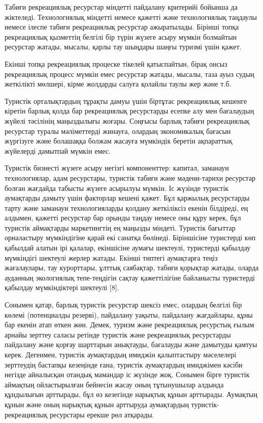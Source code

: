 Табиғи рекреациялық ресурстар міндетті пайдалану критерийі бойынша да
жіктеледі. Технологиялық міндетті немесе қажетті және технологиялық
таңдаулы немесе ілеспе табиғи рекреациялық ресурстар ажыратылады.
Бірінші топқа рекреациялық қызметтің белгілі бір түрін жүзеге асыру
мүмкін болмайтын ресурстар жатады, мысалы, қарлы тау шыңдары шаңғы
туризмі үшін қажет.

Екінші топқа рекреациялық процеске тікелей қатыспайтын, бірақ онсыз
рекреациялық процесс мүмкін емес ресурстар жатады, мысалы, таза ауыз
судың жеткілікті мөлшері, кірме жолдарды салуға қолайлы таулы жер және
т.б.

Туристік орталықтардың тұрақты дамуы үшін біртұтас рекреациялық кешенге
кіретін барлық қолда бар рекреациялық ресурстарды есепке алу мен
бағалаудың жүйелі тәсілінің маңыздылығы жоғары. Соңғысы барлық табиғи
рекреациялық ресурстар туралы мәліметтерді жинауға, олардың экономикалық
бағасын жүргізуге және болашаққа болжам жасауға мүмкіндік беретін
ақпараттық жүйелерді дамытпай мүмкін емес.

Туристік бизнесті жүзеге асыру негізгі компоненттер: капитал, заманауи
технологиялар, адам ресурстары, туристік табиғи және мәдени-тарихи
ресурстар болған жағдайда табысты жүзеге асырылуы мүмкін. Іс жүзінде
туристік аумақтарды дамыту үшін факторлар кешені қажет. Бұл қаржылық
ресурстарды тарту және заманауи технологияларды қолдану жеткіліксіз
екенін білдіреді, ең алдымен, қажетті ресурстар бар орынды таңдау немесе
оны құру керек, бұл туристік аймақтарды маркетингтің ең маңызды міндеті.
Туристік бағыттар орналастыру мүмкіндігіне қарай екі санатқа бөлінеді.
Біріншісіне туристерді көп қабылдай алатын ірі қалалар, екіншісіне
аумағы шектеулі, туристерді қабылдау мүмкіндігі шектеулі жерлер жатады.
Екінші типтегі аумақтарға теңіз жағалаулары, тау курорттары, ұлттық
саябақтар, табиғи қорықтар жатады, оларда ауданның экологиялық
тепе-теңдігін сақтау қажеттілігіне байланысты туристерді қабылдау
мүмкіндіктері шектеулі {[}8{]}.

Сонымен қатар, барлық туристік ресурстар шексіз емес, олардың белгілі
бір көлемі (потенциалды резерві), пайдалану уақыты, пайдалану
жағдайлары, құны бар екенін атап өткен жөн. Демек, туризм және
рекреациялық ресурстық ғылым арнайы зерттеу саласы ретінде туристік және
рекреациялық ресурстарды пайдалану және қорғау шарттарын анықтауды,
бағалауды және дамытуды қамтуы керек. Дегенмен, туристік аумақтардың
имиджін қалыптастыру мәселелері зерттеудің бастапқы кезеңінде ғана,
туристік аумақтардың имиджімен кәсіби негізде айналысқан отандық
мамандар іс жүзінде жоқ. Сонымен бірге туристік аймақтың ойластырылған
бейнесін жасау оның тұтынушылар алдында құндылығын арттырады, бұл өз
кезегінде нарықтық құнын арттырады. Аумақтың құнын және оның нарықтық
құнын арттыруда аумақтардың туристік-рекреациялық ресурстары ерекше рөл
атқарады.

